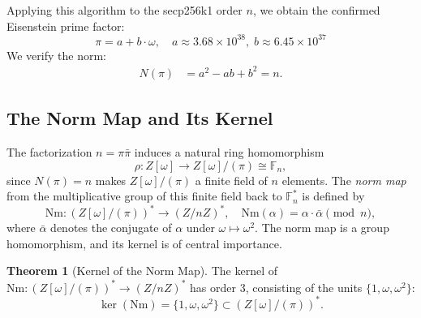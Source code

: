 \documentclass[11pt,a4paper]{article}
\theoremstyle{definition}
\newtheorem{theorem}{Theorem}[section]
\begin{document}
Applying this algorithm to the secp256k1 order $n$, we obtain the confirmed Eisenstein prime factor:
\begin{equation}
  \pi = a + b \cdot \omega, \quad a \approx 3.68 \times 10^{38}, \; b \approx 6.45 \times 10^{37}
  \label{eq:pi-factor}
\end{equation}
We verify the norm:
\begin{align}
  N(\pi) &= a^2 - ab + b^2 = n.
  \label{eq:norm-verification}
\end{align}

\subsection{The Norm Map and Its Kernel}

The factorization $n = \pi \bar{\pi}$ induces a natural ring homomorphism
\begin{equation}
  \rho : Z[\omega] \to Z[\omega]/(\pi) \cong \mathbb{F}_n,
\end{equation}
since $N(\pi) = n$ makes $Z[\omega]/(\pi)$ a finite field of $n$ elements. The \emph{norm map} from the multiplicative group of this finite field back to $\mathbb{F}_n^*$ is defined by
\begin{equation}
  \mathrm{Nm} : (Z[\omega]/(\pi))^* \to (Z/nZ)^*, \quad \mathrm{Nm}(\alpha) = \alpha \cdot \bar{\alpha} \pmod{n},
  \label{eq:norm-map}
\end{equation}
where $\bar{\alpha}$ denotes the conjugate of $\alpha$ under $\omega \mapsto \omega^2$. The norm map is a group homomorphism, and its kernel is of central importance.

\begin{theorem}[Kernel of the Norm Map]
  The kernel of $\mathrm{Nm} : (Z[\omega]/(\pi))^* \to (Z/nZ)^*$ has order $3$, consisting of the units $\{1, \omega, \omega^2\}$:
  \begin{equation}
    \ker(\mathrm{Nm}) = \{1, \omega, \omega^2\} \subset (Z[\omega]/(\pi))^*.
  \end{equation}
  \label{thm:norm-kernel}
\end{theorem}
\end{document}
